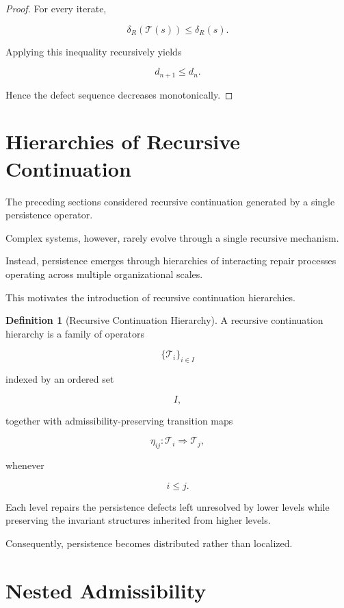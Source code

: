 \documentclass[11pt]{book}
\numberwithin{equation}{chapter}
\theoremstyle{definition}
\newtheorem{definition}{Definition}[chapter]
\theoremstyle{plain}
\begin{document}
\begin{proof}

For every iterate,

\[
\delta_R(\mathcal T(s))
\le
\delta_R(s).
\]

Applying this inequality recursively yields

\[
d_{n+1}
\le
d_n.
\]

Hence the defect sequence decreases monotonically.

\end{proof}

\section{Hierarchies of Recursive Continuation}

The preceding sections considered recursive continuation generated by a
single persistence operator.

Complex systems, however, rarely evolve through a single recursive
mechanism.

Instead, persistence emerges through hierarchies of interacting repair
processes operating across multiple organizational scales.

This motivates the introduction of recursive continuation hierarchies.

\begin{definition}[Recursive Continuation Hierarchy]

A recursive continuation hierarchy is a family of operators

\[
\{
\mathcal T_i
\}_{i\in I}
\]

indexed by an ordered set

\[
I,
\]

together with admissibility-preserving transition maps

\[
\eta_{ij}
:
\mathcal T_i
\Longrightarrow
\mathcal T_j,
\]

whenever

\[
i\le j.
\]

\end{definition}

Each level repairs the persistence defects left unresolved by lower
levels while preserving the invariant structures inherited from higher
levels.

Consequently, persistence becomes distributed rather than localized.

\section{Nested Admissibility}
\end{document}
